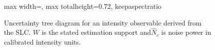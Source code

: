 \begin{figure}[ht]
\begin{adjustbox}{max width=\textwidth, max totalheight=0.72\textheight, keepaspectratio}
\begin{tikzpicture}
  \end{tikzpicture}
  \end{adjustbox}
  \caption{Uncertainty tree diagram for an intensity observable derived from the SLC. $W$ is the stated estimation support and$\widehat N_c$ is noise power in calibrated intensity units.}
  \label{fig:slc_radiometric_proposed}
\end{figure}